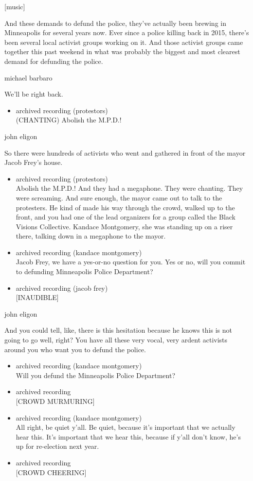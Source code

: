 {[}music{]}

And these demands to defund the police, they've actually been brewing in
Minneapolis for several years now. Ever since a police killing back in
2015, there's been several local activist groups working on it. And
those activist groups came together this past weekend in what was
probably the biggest and most clearest demand for defunding the police.

michael barbaro

We'll be right back.

\begin{itemize}
\tightlist
\item
  archived recording (protestors)\\
  (CHANTING) Abolish the M.P.D.!
\end{itemize}

john eligon

So there were hundreds of activists who went and gathered in front of
the mayor Jacob Frey's house.

\begin{itemize}
\item
  archived recording (protestors)\\
  Abolish the M.P.D.! And they had a megaphone. They were chanting. They
  were screaming. And sure enough, the mayor came out to talk to the
  protesters. He kind of made his way through the crowd, walked up to
  the front, and you had one of the lead organizers for a group called
  the Black Visions Collective. Kandace Montgomery, she was standing up
  on a riser there, talking down in a megaphone to the mayor.
\item
  archived recording (kandace montgomery)\\
  Jacob Frey, we have a yes-or-no question for you. Yes or no, will you
  commit to defunding Minneapolis Police Department?
\item
  archived recording (jacob frey)\\
  {[}INAUDIBLE{]}
\end{itemize}

john eligon

And you could tell, like, there is this hesitation because he knows this
is not going to go well, right? You have all these very vocal, very
ardent activists around you who want you to defund the police.

\begin{itemize}
\item
  archived recording (kandace montgomery)\\
  Will you defund the Minneapolis Police Department?
\item
  archived recording\\
  {[}CROWD MURMURING{]}
\item
  archived recording (kandace montgomery)\\
  All right, be quiet y'all. Be quiet, because it's important that we
  actually hear this. It's important that we hear this, because if y'all
  don't know, he's up for re-election next year.
\item
  archived recording\\
  {[}CROWD CHEERING{]}
\end{itemize}

